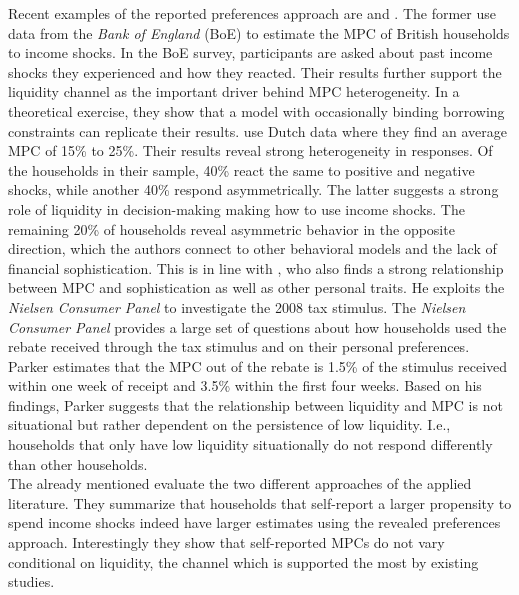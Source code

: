 Recent examples of the reported preferences approach are \cite{bunnetal_2018} and \cite{christelisetal_2019}. The former use data from the \textit{Bank of England} (BoE) to estimate the MPC of British households to income shocks. In the BoE survey, participants are asked about past income shocks they experienced and how they reacted. Their results further support the liquidity channel as the important driver behind MPC heterogeneity. In a theoretical exercise, they show that a model with occasionally binding borrowing constraints can replicate their results. \cite{christelisetal_2019} use Dutch data where they find an average MPC of 15\% to 25\%. Their results reveal strong heterogeneity in responses. Of the households in their sample, 40\% react the same to positive and negative shocks, while another 40\% respond asymmetrically. The latter suggests a strong role of liquidity in decision-making making how to use income shocks. The remaining 20\% of households reveal asymmetric behavior in the opposite direction, which the authors connect to other behavioral models and the lack of financial sophistication. This is in line with \cite{parker_2017}, who also finds a strong relationship between MPC and sophistication as well as other personal traits. He exploits the \textit{Nielsen Consumer Panel} to investigate the 2008 tax stimulus. The \textit{Nielsen Consumer Panel} provides a large set of questions about how households used the rebate received through the tax stimulus and on their personal preferences. Parker estimates that the MPC out of the rebate is 1.5\% of the stimulus received within one week of receipt and 3.5\% within the first four weeks. Based on his findings, Parker suggests that the relationship between liquidity and MPC is not situational but rather dependent on the persistence of low liquidity. I.e., households that only have low liquidity situationally do not respond differently than other households. \\
The already mentioned \cite{parkersouleles_2019} evaluate the two different approaches of the applied literature. They summarize that households that self-report a larger propensity to spend income shocks indeed have larger estimates using the revealed preferences approach. Interestingly they show that self-reported MPCs do not vary conditional on liquidity, the channel which is supported the most by existing studies. \\
